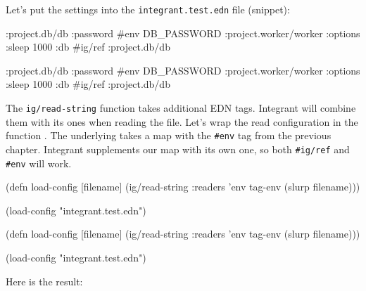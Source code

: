 Let's put the settings into the \texttt{integrant\-.test.edn} file (snippet):

\ifnarrow

\begin{english}
  \begin{clojure}
{:project.db/db
 {:password #env DB_PASSWORD}
 :project.worker/worker
 {:options {:sleep 1000}
  :db #ig/ref :project.db/db}}
  \end{clojure}
\end{english}

\else

\begin{english}
  \begin{clojure}
{:project.db/db {:password #env DB_PASSWORD}
 :project.worker/worker {:options {:sleep 1000}
                         :db #ig/ref :project.db/db}}
  \end{clojure}
\end{english}

\fi

The \verb|ig/read-string| function takes additional EDN tags. Integrant will combine them with its ones when reading the file. Let's wrap the read configuration in the function . The underlying  takes a map with the \verb|#env| tag from the previous chapter. Integrant supplements our map with its own one, so both \verb|#ig/ref| and \verb|#env| will work.

\ifnarrow

\begin{english}
  \begin{clojure}
(defn load-config [filename]
  (ig/read-string
    {:readers {'env tag-env}}
    (slurp filename)))

(load-config "integrant.test.edn")
  \end{clojure}
\end{english}

\else

\begin{english}
  \begin{clojure}
(defn load-config [filename]
  (ig/read-string {:readers {'env tag-env}}
                  (slurp filename)))

(load-config "integrant.test.edn")
  \end{clojure}
\end{english}

\fi

\noindent
Here is the result:

